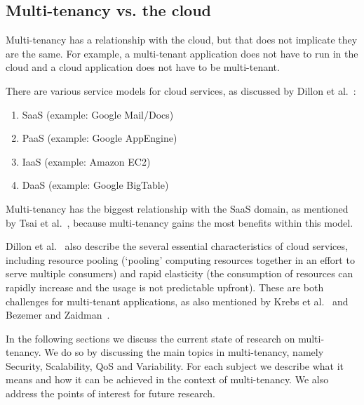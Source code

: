 \subsection{Multi-tenancy vs. the cloud}

Multi-tenancy has a relationship with the cloud, but that does not implicate they are the same. For example, a multi-tenant application does not have to run in the cloud and a cloud application does not have to be multi-tenant.

There are various service models for cloud services, as discussed by Dillon et al.~\cite{dillon2010cloud}:
\begin{enumerate}
\item \acf{SaaS} (example: Google Mail/Docs)
\item \acf{PaaS} (example: Google AppEngine)
\item \acf{IaaS} (example: Amazon EC2)
\item \acf{DaaS} (example: Google BigTable)
\end{enumerate}

Multi-tenancy has the biggest relationship with the \ac{SaaS} domain, as mentioned by Tsai et al.~\cite{tsai2010towards}, because multi-tenancy gains the most benefits within this model.

Dillon et al.~\cite{dillon2010cloud} also describe the several essential characteristics of cloud services, including resource pooling (`pooling' computing resources together in an effort to serve multiple consumers) and rapid elasticity (the consumption of resources can rapidly increase and the usage is not predictable upfront). These are both challenges for multi-tenant applications, as also mentioned by Krebs et al.~\cite{krebs2012architecture} and Bezemer and Zaidman~\cite{bezemer2010multi}.

In the following sections we discuss the current state of research on multi-tenancy. We do so by discussing the main topics in multi-tenancy, namely Security, Scalability, \ac{QoS} and Variability. For each subject we describe what it means and how it can be achieved in the context of multi-tenancy. We also address the points of interest for future research.